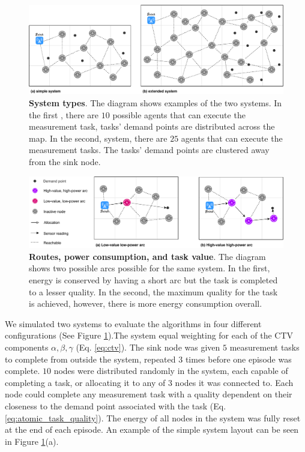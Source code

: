 \begin{figure}[ht]
	\centering
	\includegraphics[width=0.9\linewidth, trim={25pt 0pt 25pt 0pt, clip}]{system-types}
	\caption{\textbf{System types}. The diagram shows examples of the two systems. In the first \simulationSimple{}{}, there are $10$ possible agents that can execute the measurement task, tasks' demand points are distributed across the map. In the second, \simulationExtended{}{} system, there are $25$ agents that can execute the measurement tasks. The tasks' demand points are clustered away from the sink node.}
	\label{fig:system-types}
\end{figure}
\begin{figure}[ht]
	\centering
	\includegraphics[width=0.9\linewidth, trim={25pt 0pt 25pt 0pt, clip}]{route-types}
	\caption{\textbf{Routes, power consumption, and task value}. The diagram shows two possible arcs possible for the same system. In the first, energy is conserved by having a short arc but the task is completed to a lesser quality. In the second, the maximum quality for the task is achieved, however, there is more energy consumption overall.}
	\label{fig:route_types}
\end{figure}
We simulated two systems to evaluate the algorithms in four different configurations (See Figure \ref{fig:system-types}).The \simulationSimple{}{} system  equal weighting for each of the CTV components $\alpha, \beta, \gamma$ (Eq. \ref{eq:ctv}). The sink node was given $5$ measurement tasks to complete from outside the system, repeated $3$ times before one episode was complete. $10$ nodes were distributed randomly in the system, each capable of completing a task, or allocating it to any of $3$ nodes it was connected to. Each node could complete any measurement task with a quality dependent on their closeness to the demand point associated with the task (Eq. \ref{eq:atomic_task_quality}). The energy of all nodes in the system was fully reset at the end of each episode. An example of the simple system layout can be seen in Figure \ref{fig:system-types}(a). 

